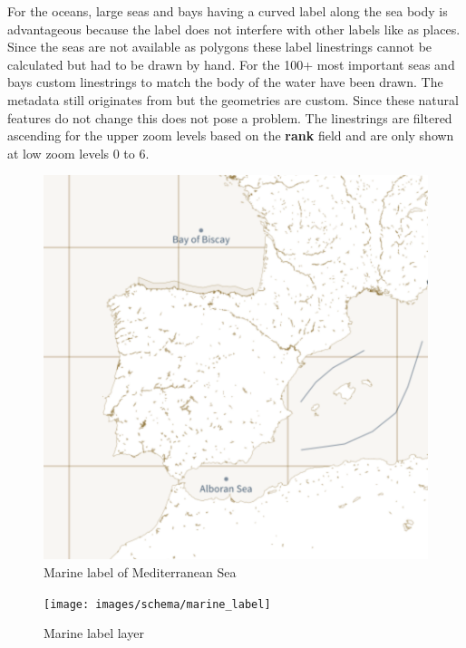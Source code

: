 \noindent\begin{minipage}[t]{0.48\linewidth}
    \vspace{0pt}
    For the oceans, large seas and bays having a curved label along the sea body is advantageous because the label does not interfere with other labels like as places.
    Since the seas are not available as polygons these label linestrings cannot be calculated but had to be drawn by hand. For the 100+ most important seas and bays custom linestrings to match the body of the water have been drawn. The metadata still originates from \osm{} but the geometries are custom. Since these natural features do not change this does not pose a problem. The linestrings are filtered ascending for the upper zoom levels based on the \textbf{rank} field and are only shown at low zoom levels 0 to 6.
\end{minipage}
\hfill
\begin{minipage}[t]{0.48\linewidth}
    \vspace{-15pt}
    \begin{figure}[H]
      \includegraphics[width=1\textwidth]{images/schema/marine_label_example}
      \caption{Marine label of Mediterranean Sea}
    \end{figure}
\end{minipage}

\begin{figure}[H]
  \centering
  \texttt{[image: images/schema/marine\_label]}
  \caption{Marine label layer}
\end{figure}






